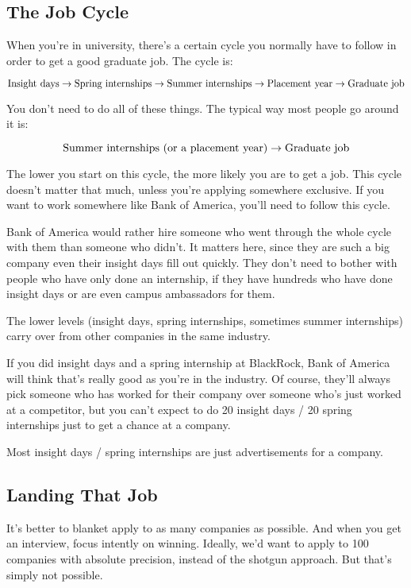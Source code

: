 \documentclass{article}
\begin{document}
\subsection{The Job Cycle}
When you're in university, there's a certain cycle you normally have to
follow in order to get a good graduate job. The cycle is:

$$\hbox{Insight days} \rightarrow \hbox{Spring internships} \rightarrow \hbox{Summer internships} \rightarrow \hbox{Placement year} \rightarrow \hbox{Graduate job}$$

You don't need to do all of these things. The typical way most people go
around it is:

$$\hbox{Summer internships (or a placement year)} \rightarrow \hbox{Graduate job}$$

The lower you start on this cycle, the more likely you are to get a job.
This cycle doesn't matter that much, unless you're applying somewhere
exclusive. If you want to work somewhere like Bank of America, you'll
need to follow this cycle.

Bank of America would rather hire someone who went through the whole
cycle with them than someone who didn't. It matters here, since they are
such a big company even their insight days fill out quickly. They don't
need to bother with people who have only done an internship, if they
have hundreds who have done insight days or are even campus ambassadors
for them.

The lower levels (insight days, spring internships, sometimes summer
internships) carry over from other companies in the same industry.

If you did insight days and a spring internship at BlackRock, Bank of
America will think that's really good as you're in the industry. Of
course, they'll always pick someone who has worked for their company
over someone who's just worked at a competitor, but you can't expect to
do 20 insight days / 20 spring internships just to get a chance at a
company.

Most insight days / spring internships are just advertisements for a
company.
\subsection{Landing That Job}
It's better to blanket apply to as many companies as possible. And when you get an interview, focus intently on winning. Ideally, we'd want to apply to 100 companies with absolute precision, instead of the shotgun approach. But that's simply not possible.
\end{document}
